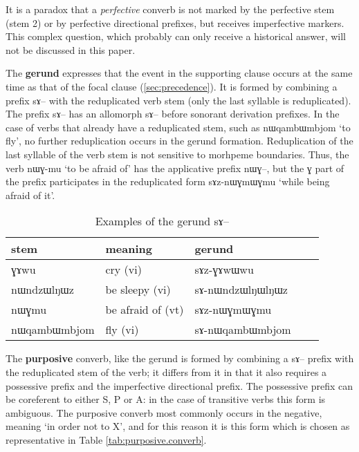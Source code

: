 \documentclass[oldfontcommands,oneside,a4paper,11pt]{article}
\newcommand{\ipa}[1]{{\phon \mbox{#1}}} %
\begin{document}
It is a paradox that a \textit{perfective}  converb is not marked by the perfective stem (stem 2) or by perfective directional prefixes, but receives imperfective markers. This complex question, which probably can only receive a historical answer, will not be discussed in this paper.

The \textbf{gerund}   expresses that the event in the supporting clause occurs at the same time as that of the focal clause (\ref{sec:precedence}). It is formed by combining a prefix  \ipa{sɤ}-- with the reduplicated verb stem (only the last syllable is reduplicated). The prefix \ipa{sɤ}-- has an allomorph \ipa{sɤ}-- before sonorant derivation prefixes.  In the case of verbs that already have a reduplicated stem, such as \ipa{nɯqambɯmbjom} `to fly', no further reduplication occurs in the gerund formation. Reduplication of the last syllable of the verb stem is not sensitive to morhpeme boundaries. Thus, the verb \ipa{nɯɣ-mu} `to be afraid of' has the applicative prefix \ipa{nɯɣ}--, but the \ipa{ɣ} part of the prefix participates in the reduplicated form \ipa{sɤz-nɯɣmɯɣmu} `while being afraid of it'.

\begin{table}[h]
\caption{Examples of the gerund \ipa{sɤ}--} \label{tab:gerund}
\begin{tabular}{lllll}
\toprule
stem & meaning & gerund \\
\midrule
\ipa{ɣɤwu}& cry (vi)& \ipa{sɤz-ɣɤwɯwu}\\
\ipa{nɯndzɯlŋɯz}& be sleepy (vi)& \ipa{sɤ-nɯndzɯlŋɯlŋɯz}\\
\ipa{nɯɣmu}& be afraid of (vt)& \ipa{sɤz-nɯɣmɯɣmu}\\
\midrule
\ipa{nɯqambɯmbjom} & fly (vi) &\ipa{sɤ-nɯqambɯmbjom} \\

\bottomrule
\end{tabular}
\end{table}

The \textbf{purposive} converb, like the gerund is formed by combining a \ipa{sɤ}-- prefix with the reduplicated stem of the verb; it differs from it in that it also requires a possessive prefix  and the imperfective directional prefix. The possessive prefix can be coreferent to either S, P or A: in the case of transitive verbs this form is ambiguous. The purposive converb   most commonly occurs in the negative, meaning `in order not to X', and for this reason it is this form which is chosen as representative in Table \ref{tab:purposive.converb}.
\end{document}
